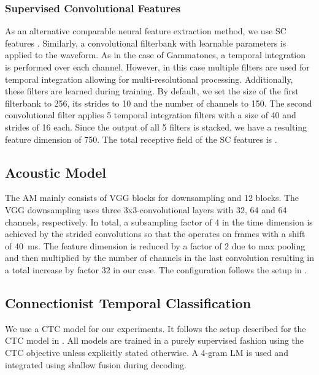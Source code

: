 \documentclass{INTERSPEECH2023}
\begin{document}
\subsubsection{Supervised Convolutional Features}
As an alternative comparable neural feature extraction method, we use \gls{SC} features \cite{tuske2018:waveform, vieting2021waveform}.
Similarly, a convolutional filterbank with learnable parameters is applied to the waveform.
As in the case of Gammatones, a temporal integration is performed over each channel.
However, in this case multiple filters are used for temporal integration allowing for multi-resolutional processing.
Additionally, these filters are learned during training.
By default, we set the size of the first filterbank to 256, its strides to 10 and the number of channels to 150.
The second convolutional filter applies 5 temporal integration filters with a size of 40 and strides of 16 each.
Since the output of all 5 filters is stacked, we have a resulting feature dimension of 750.
The total receptive field of the \gls{SC} features is .

\subsection{Acoustic Model}
The \gls{AM} mainly consists of \gls{VGG} \addref blocks for downsampling and 12 \conformer blocks.
The \gls{VGG} downsampling uses three 3x3-convolutional layers with 32, 64 and 64 channels, respectively.
In total, a subsampling factor of 4 in the time dimension is achieved by the strided convolutions so that the \conformer operates on frames with a shift of \SI{40}{\milli\second}.
The feature dimension is reduced by a factor of 2 due to max pooling and then multiplied by the number of channels in the last convolution resulting in a total increase by factor 32 in our case.
The configuration follows the setup in \cite{zeineldeen2022robustconformer} .

\subsection{Connectionist Temporal Classification}
We use a \gls{CTC} model for our experiments.
It follows the setup described for the \gls{CTC} model in \cite{zhou2022efficient}.
All models are trained in a purely supervised fashion using the \gls{CTC} objective unless explicitly stated otherwise.
A 4-gram \gls{LM} is used and integrated using shallow fusion \cite{gulcehre2015shallow} during decoding.
\end{document}
